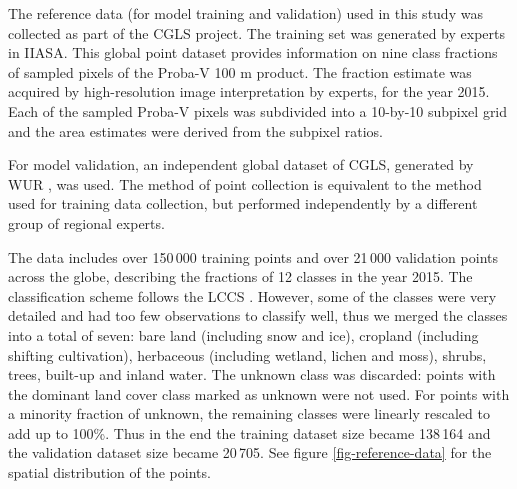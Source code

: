 \documentclass[review,authoryear,3p]{elsarticle}
\begin{document}
The reference data (for model training and validation) used in this study was collected as part of the \ac{CGLS} project.
The training set was generated by experts in \ac{IIASA}.
This global point dataset provides information on nine class fractions of sampled pixels of the Proba-V 100 m product.
The fraction estimate was acquired by high-resolution image interpretation by experts, for the year 2015.
Each of the sampled Proba-V pixels was subdivided into a 10-by-10 subpixel grid and the area estimates were derived from the subpixel ratios.

For model validation, an independent global dataset of \ac{CGLS}, generated by \gls{WUR} \citep{tsendbazar_developing_2018}, was used.
The method of point collection is equivalent to the method used for training data collection, but performed independently by a different group of regional experts.

The data includes over 150\,000 training points and over 21\,000 validation points across the globe, describing the fractions of 12 classes in the year 2015.
The classification scheme follows the \gls{LCCS} \citep{buchhorn_moderate_2019}.
However, some of the classes were very detailed and had too few observations to classify well, thus we merged the classes into a total of seven: bare land (including snow and ice), cropland (including shifting cultivation), herbaceous (including wetland, lichen and moss), shrubs, trees, built-up and inland water.
The unknown class was discarded: points with the dominant land cover class marked as unknown were not used.
For points with a minority fraction of unknown, the remaining classes were linearly rescaled to add up to 100\%.
Thus in the end the training dataset size became 138\,164 and the validation dataset size became 20\,705. See figure \ref{fig-reference-data} for the spatial distribution of the points.

\end{document}
